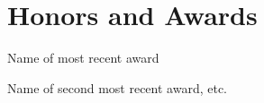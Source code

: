 \documentclass[12pt]{safecv}%
\begin{document}
\section*{Honors and Awards}

\begin{description}[noitemsep]
\item[year] Name of most recent award
\item[year] Name of second most recent award, etc.
\end{description}

\end{document}
